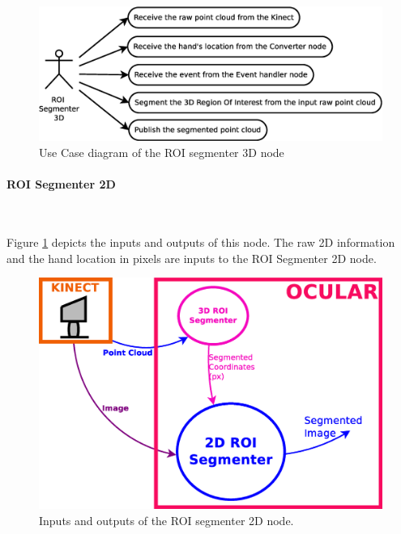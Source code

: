 	\begin{figure}[H]
		\centering
	\includegraphics[scale=0.4]{img/diagrams/uc_roi_segmenter_3d.eps}
		\caption[Use case diagram ROI segmenter 3D node]{Use Case diagram of the ROI segmenter 3D node}
		
	\end{figure}
 
 \newpage

\paragraph{ROI Segmenter 2D}\mbox{}\\
	\label{roi_segmenter_2d}
	
	Figure \ref{node_roi2d} depicts the inputs and outputs of this node. 
	The raw 2D information and the hand location in pixels are inputs to the ROI Segmenter 2D node. 

		\begin{figure}[H]
			\begin{center}
			\includegraphics[width=0.5\linewidth]{img/diagrams/node_roi2d.eps}
			\caption[ROI segmenter 2D node I/O]{Inputs and outputs of the ROI segmenter 2D node.}		
			\label{node_roi2d}
			\end{center}
		\end{figure}

